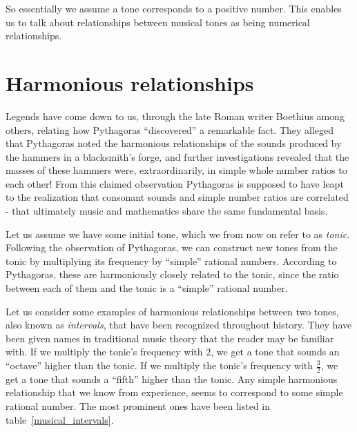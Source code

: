\documentclass[a4paper]{book}
\theoremstyle{definition}
\begin{document}

So essentially we assume a tone corresponds to a positive number.
This enables us to talk about relationships between musical tones as being numerical relationships.

\section{Harmonious relationships}
Legends have come down to us, through the late Roman writer Boethius among others, relating how Pythagoras ``discovered'' a remarkable fact.
They alleged that Pythagoras noted the harmonious relationships of the sounds produced by the hammers in a blacksmith's forge, and further investigations revealed that the masses of these hammers were, extraordinarily, in simple whole number ratios to each other!
From this claimed observation Pythagoras is supposed to have leapt to the realization that consonant sounds and simple number ratios are correlated - that ultimately music and mathematics share the same fundamental basis. \cite{NeilBibby}

Let us assume we have some initial tone, which we from now on refer to as \emph{tonic}.
Following the observation of Pythagoras, we can construct new tones from the tonic by multiplying its frequency by ``simple'' rational numbers.
According to Pythagoras, these are harmoniously closely related to the tonic, since the ratio between each of them and the tonic is a ``simple'' rational number.

Let us consider some examples of harmonious relationships between two tones, also known as \emph{intervals}, that have been recognized throughout history.
They have been given names in traditional music theory that the reader may be familiar with.
If we multiply the tonic's frequency with $2$, we get a tone that sounds an ``octave'' higher than the tonic.
If we multiply the tonic's frequency with $\frac{3}{2}$, we get a tone that sounds a ``fifth'' higher than the tonic.
Any simple harmonious relationship that we know from experience, seems to correspond to some simple rational number.
The most prominent ones have been listed in table~\ref{musical_intervals}.
\end{document}
